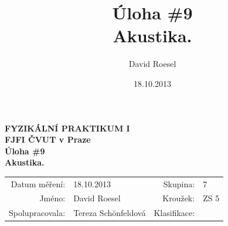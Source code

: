 \documentclass[english]{article}
\newcommand{\Author}{David Roesel}
\newcommand{\Coauthor}{Tereza Schönfeldová}
\newcommand{\Institute}{FJFI ČVUT v Praze}
\newcommand{\Subject}{FYZIKÁLNÍ PRAKTIKUM I}
\newcommand{\Group}{7}
\newcommand{\Circle}{ZS 5}
\newcommand{\Title}{Úloha \#9 \\Akustika.}
\newcommand{\Date}{18.10.2013}
\begin{document}
\author{\Author}
\title{\Title}
\date{\Date}

\renewcommand{\figurename}{Obr.}
\renewcommand{\tablename}{Tab.}
\renewcommand{\refname}{Reference}


\setlength{\parindent}{0cm}
\begin{multicols}{2}
\textbf{\Subject \\
        \Institute \\[0.1cm]
\large  \Title \\[0.5cm]
}
\begin{tabular}{rlrl}
\large Datum měření: & \Date & \large Skupina: & \Group \\
\large Jméno: & \Author & \large Kroužek:  & \Circle\\
\large Spolupracovala: & \Coauthor &\large Klasifikace:\\
\end{tabular}


\end{multicols}
\end{document}
